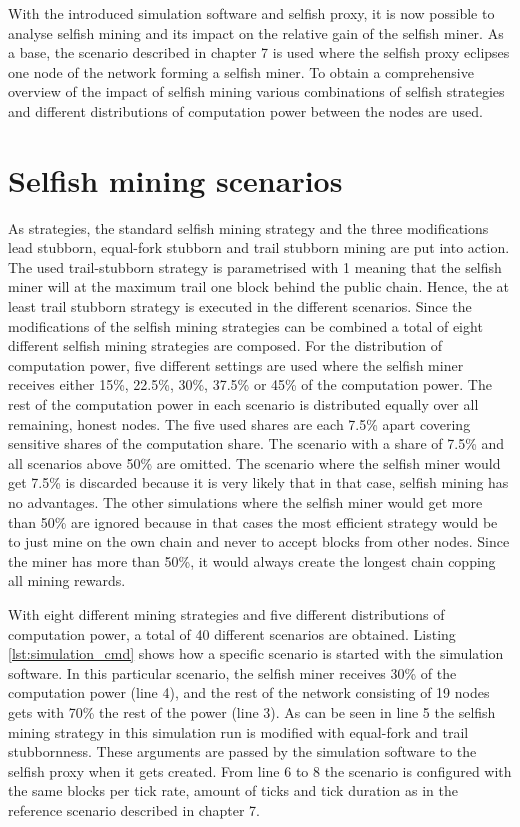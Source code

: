 With the introduced simulation software and selfish proxy, it is now possible to analyse selfish mining and its impact on the relative gain of the selfish miner.
As a base, the scenario described in chapter 7 is used where the selfish proxy eclipses one node of the network forming a selfish miner.
To obtain a comprehensive overview of the impact of selfish mining various combinations of selfish strategies and different distributions of computation power between the nodes are used.

\section{Selfish mining scenarios}

As strategies, the standard selfish mining strategy and the three modifications lead stubborn, equal-fork stubborn and trail stubborn mining are put into action.
The used trail-stubborn strategy is parametrised with 1 meaning that the selfish miner will at the maximum trail one block behind the public chain.
Hence, the at least trail stubborn strategy is executed in the different scenarios.
Since the modifications of the selfish mining strategies can be combined a total of eight different selfish mining strategies are composed.
For the distribution of computation power, five different settings are used where the selfish miner receives either 15\%, 22.5\%, 30\%, 37.5\% or 45\% of the computation power.
The rest of the computation power in each scenario is distributed equally over all remaining, honest nodes.
The five used shares are each 7.5\% apart covering sensitive shares of the computation share.
The scenario with a share of 7.5\% and all scenarios above 50\% are omitted.
The scenario where the selfish miner would get 7.5\% is discarded because it is very likely that in that case, selfish mining has no advantages.
The other simulations where the selfish miner would get more than 50\% are ignored because in that cases the most efficient strategy would be to just mine on the own chain and never to accept blocks from other nodes. 
Since the miner has more than 50\%, it would always create the longest chain copping all mining rewards.

With eight different mining strategies and five different distributions of computation power, a total of 40 different scenarios are obtained.
Listing \ref{lst:simulation_cmd} shows how a specific scenario is started with the simulation software.
In this particular scenario, the selfish miner receives 30\% of the computation power (line 4), and the rest of the network consisting of 19 nodes gets with 70\% the rest of the power (line 3).
As can be seen in line 5 the selfish mining strategy in this simulation run is modified with equal-fork and trail stubbornness.
These arguments are passed by the simulation software to the selfish proxy when it gets created.
From line 6 to 8 the scenario is configured with the same blocks per tick rate, amount of ticks and tick duration as in the reference scenario described in chapter 7.

